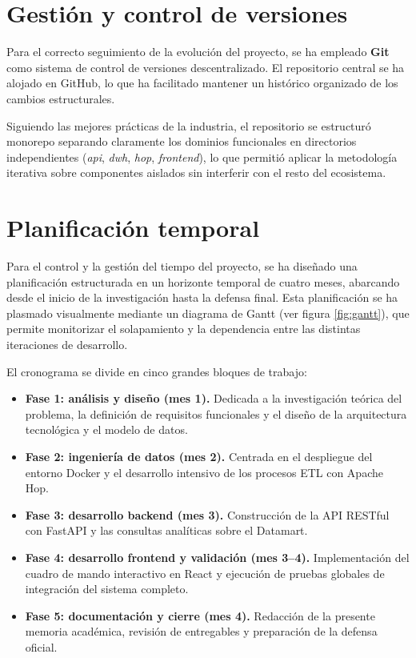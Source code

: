 \section{Gestión y control de versiones}
Para el correcto seguimiento de la evolución del proyecto, se ha empleado \textbf{Git} como sistema de control de versiones descentralizado. El repositorio central se ha alojado en GitHub, lo que ha facilitado mantener un histórico organizado de los cambios estructurales.

Siguiendo las mejores prácticas de la industria, el repositorio se estructuró monorepo separando claramente los dominios funcionales en directorios independientes (\textit{api}, \textit{dwh}, \textit{hop}, \textit{frontend}), lo que permitió aplicar la metodología iterativa sobre componentes aislados sin interferir con el resto del ecosistema.

\section{Planificación temporal}

Para el control y la gestión del tiempo del proyecto, se ha diseñado una planificación estructurada en un horizonte temporal de cuatro meses, abarcando desde el inicio de la investigación hasta la defensa final. Esta planificación se ha plasmado visualmente mediante un diagrama de Gantt (ver figura \ref{fig:gantt}), que permite monitorizar el solapamiento y la dependencia entre las distintas iteraciones de desarrollo.

El cronograma se divide en cinco grandes bloques de trabajo:

\begin{itemize}
    \item \textbf{Fase 1: análisis y diseño (mes 1).} Dedicada a la investigación teórica del problema, la definición de requisitos funcionales y el diseño de la arquitectura tecnológica y el modelo de datos.
    \item \textbf{Fase 2: ingeniería de datos (mes 2).} Centrada en el despliegue del entorno Docker y el desarrollo intensivo de los procesos ETL con Apache Hop.
    \item \textbf{Fase 3: desarrollo backend (mes 3).} Construcción de la API RESTful con FastAPI y las consultas analíticas sobre el Datamart.
    \item \textbf{Fase 4: desarrollo frontend y validación (mes 3--4).} Implementación del cuadro de mando interactivo en React y ejecución de pruebas globales de integración del sistema completo.
    \item \textbf{Fase 5: documentación y cierre (mes 4).} Redacción de la presente memoria académica, revisión de entregables y preparación de la defensa oficial.
\end{itemize}

